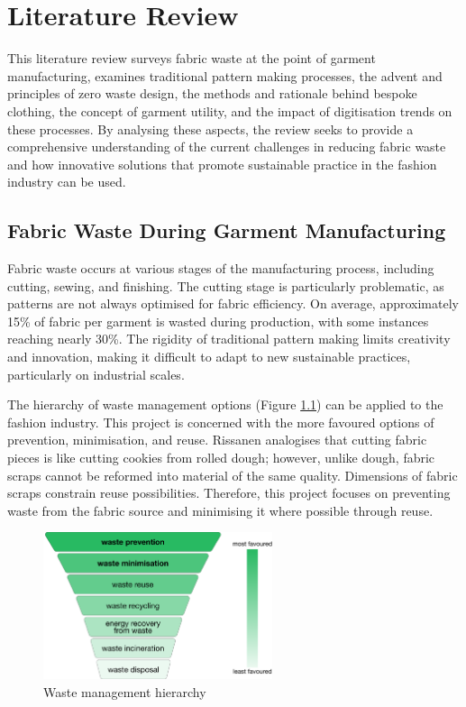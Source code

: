 \chapter{Literature Review}
This literature review surveys fabric waste at the point of garment manufacturing, examines traditional pattern making processes, the advent and principles of zero waste design, the methods and rationale behind bespoke clothing, the concept of garment utility, and the impact of digitisation trends on these processes. By analysing these aspects, the review seeks to provide a comprehensive understanding of the current challenges in reducing fabric waste and how innovative solutions that promote sustainable practice in the fashion industry can be used.

\section{Fabric Waste During Garment Manufacturing}
Fabric waste occurs at various stages of the manufacturing process, including cutting, sewing, and finishing. The cutting stage is particularly problematic, as patterns are not always optimised for fabric efficiency. On average, approximately 15\% of fabric per garment is wasted during production, with some instances reaching nearly 30\%. The rigidity of traditional pattern making limits creativity and innovation, making it difficult to adapt to new sustainable practices, particularly on industrial scales.

The hierarchy of waste management options (Figure \ref{fig:waste_hierarchy}) can be applied to the fashion industry. This project is concerned with the more favoured options of prevention, minimisation, and reuse. Rissanen analogises that cutting fabric pieces is like cutting cookies from rolled dough; however, unlike dough, fabric scraps cannot be reformed into material of the same quality. Dimensions of fabric scraps constrain reuse possibilities. Therefore, this project focuses on preventing waste from the fabric source and minimising it where possible through reuse.
\begin{figure} [htb]
    \centering
    \includegraphics[width=0.6\textwidth]{Images/waste hierarchy.png}
    \caption{Waste management hierarchy}
    \label{fig:waste_hierarchy}
\end{figure}


